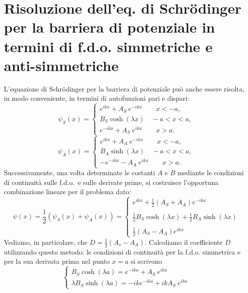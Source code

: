 \documentclass[a4paper,12pt,oneside]{book}
\begin{document}
\section{Risoluzione dell'eq. di Schr\"{o}dinger per la barriera di potenziale in termini di f.d.o. simmetriche e anti-simmetriche}
L'equazione di Schr\"{o}dinger per la barriera di potenziale può anche essere risolta, in modo conveniente, in termini di autofunzioni pari e dispari:
	\begin{equation}
		\psi _S (x) =
		\begin{cases}
		\displaystyle{e^{ikx} + A_S\ e^{-ikx} \qquad x<-a,}\\
		B_S \cosh (\lambda x) \quad -a<x<a,\\
		\displaystyle{e^{-ikx} + A_S\ e^{ikx} \qquad x>a.}
		\end{cases}
	\end{equation}
	\begin{equation}
		\psi _A (x) =
		\begin{cases}
		\displaystyle{e^{ikx} + A_A\ e^{-ikx} \qquad x<-a,}\\
		B_A \sinh (\lambda x) \quad -a<x<a,\\
		\displaystyle{-e^{-ikx} - A_A\ e^{ikx} \qquad x>a.}
		\end{cases}
	\end{equation}
Successivamente, una volta determinate le costanti $A$ e $B$ mediante le condizioni di continuità sulle f.d.o.~e sulle derivate prime, si costruisce l'opportuna combinazione lineare per il problema dato:
	\begin{equation}
		\psi (x) =\frac{1}{2}\left(\psi _S (x) + \psi _A (x) \right) =
		\begin{cases}
		\displaystyle{e^{ikx} + \frac{1}{2}\left(A_S+A_A\right) e^{-ikx}} \\
		\\
		\displaystyle{\frac{1}{2}B_S \cosh (\lambda x )+ \frac{1}{2} B_A \sinh (\lambda x)} \\
		\\
		\displaystyle{\frac{1}{2}\left(A_S - A_A \right) e^{ikx}}
		\end{cases}
	\end{equation}
Vediamo, in particolare, che $\displaystyle{D=\frac{1}{2}\left( A_s - A_A \right)}$. Calcoliamo il coefficiente $D$ utilizzando questo metodo: le condizioni di continuità per la f.d.o. simmetrica e per la sua derivata prima nel punto $x=a$ si scrivono
	\begin{equation}
		\begin{cases}
		\displaystyle{B_S \cosh (\lambda a) = e^{-ika}+ A_S\ e^{ika}}\\
		\displaystyle{\lambda B_S \sinh (\lambda a) = -ik e^{-ika}+ ikA_S\ e^{ika}}
		\end{cases}
	\label{eq:cap10_6}
	\end{equation}
\end{document}
